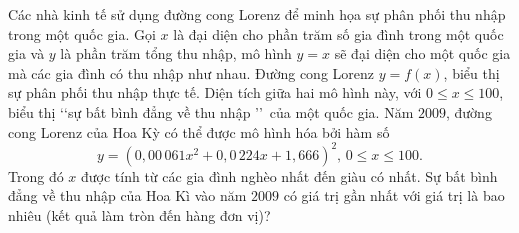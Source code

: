 \begin{bt}%

	Các nhà kinh tế sử dụng đường cong Lorenz để minh họa sự phân phối thu nhập trong một quốc gia. Gọi $x$ là đại diện cho phần trăm số gia đình trong một quốc gia và $y$ là phần trăm tổng thu nhập, mô hình $y=x$ sẽ đại diện cho một quốc gia mà các gia đình có thu nhập như nhau. Đường cong Lorenz $y=f(x)$, biểu thị sự phân phối thu nhập thực tế. Diện tích giữa hai mô hình này, với $0\leq x\leq 100$, biểu thị \lq\lq sự bất bình đẳng về thu nhập \rq\rq \, của một quốc gia. Năm $2009$, đường cong Lorenz của Hoa Kỳ có thể được mô hình hóa bởi hàm số
	$$
	y=\left(0{,}00\,061x^2+0{,}0\,224x+1{,}666\right)^2,\,0\leq x\leq 100.
	$$
	Trong đó $x$ được tính từ các gia đình nghèo nhất đến giàu có nhất. Sự bất bình đẳng về thu nhập của Hoa Kì vào năm $2009$ có giá trị gần nhất với giá trị là bao nhiêu (kết quả làm tròn đến hàng đơn vị)?\\
\end{bt}
